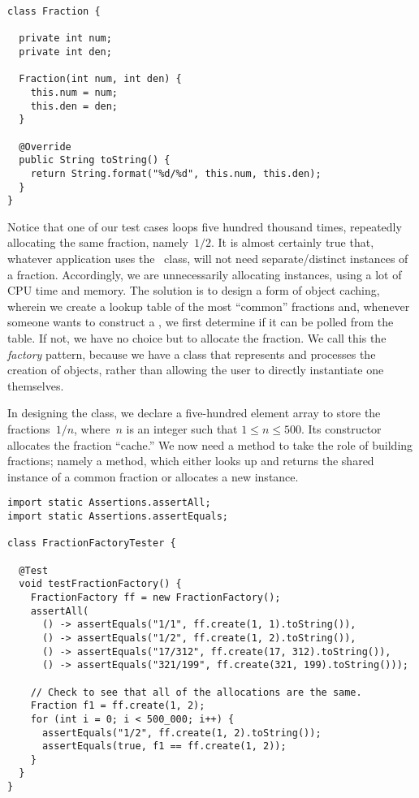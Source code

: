 \begin{lstlisting}[language=MyJava]
class Fraction {

  private int num;
  private int den;

  Fraction(int num, int den) {
    this.num = num;
    this.den = den;
  }

  @Override
  public String toString() { 
    return String.format("%d/%d", this.num, this.den); 
  }
}
\end{lstlisting}

Notice that one of our test cases loops five hundred thousand times, repeatedly allocating the same fraction, namely~$1/2$. 
It is almost certainly true that, whatever application uses the~ class, will not need separate/distinct instances of a fraction. 
Accordingly, we are unnecessarily allocating  instances, using a lot of CPU time and memory. 
The solution is to design a form of object caching, wherein we create a lookup table of the most ``common'' fractions and, whenever someone wants to construct a , we first determine if it can be polled from the table. 
If not, we have no choice but to allocate the fraction. 
We call this the \emph{factory} pattern, because we have a class that represents and processes the creation of  objects, rather than allowing the user to directly instantiate one themselves. 

In designing the  class, we declare a five-hundred element array to store the fractions~$1/n$, where~$n$ is an integer such that $1 \leq n \leq 500$. 
Its constructor allocates the fraction ``cache.'' 
We now need a method to take the role of building fractions; namely a  method, which either looks up and returns the shared instance of a common fraction or allocates a new instance.

\begin{lstlisting}[language=MyJava]
import static Assertions.assertAll;
import static Assertions.assertEquals;

class FractionFactoryTester {

  @Test
  void testFractionFactory() {
    FractionFactory ff = new FractionFactory();
    assertAll(
      () -> assertEquals("1/1", ff.create(1, 1).toString()),
      () -> assertEquals("1/2", ff.create(1, 2).toString()),
      () -> assertEquals("17/312", ff.create(17, 312).toString()),
      () -> assertEquals("321/199", ff.create(321, 199).toString()));

    // Check to see that all of the allocations are the same.
    Fraction f1 = ff.create(1, 2);
    for (int i = 0; i < 500_000; i++) {
      assertEquals("1/2", ff.create(1, 2).toString());
      assertEquals(true, f1 == ff.create(1, 2));
    }
  }
}
\end{lstlisting}

